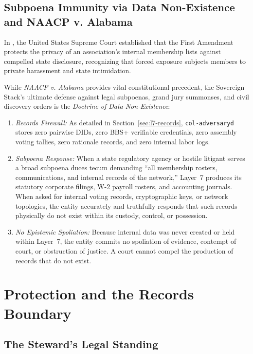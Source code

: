 \subsection{Subpoena Immunity via Data Non-Existence and NAACP v. Alabama}

In \textcite{naacp1958}, the United States Supreme Court established that the First Amendment protects the privacy of an association's internal membership lists against compelled state disclosure, recognizing that forced exposure subjects members to private harassment and state intimidation.

While \textit{NAACP v. Alabama} provides vital constitutional precedent, the Sovereign Stack's ultimate defense against legal subpoenas, grand jury summonses, and civil discovery orders is the \textit{Doctrine of Data Non-Existence}:
\begin{enumerate}
  \item \textit{Records Firewall:} As detailed in Section~\ref{sec:l7-records}, \texttt{col-adversaryd} stores zero pairwise DIDs, zero BBS+ verifiable credentials, zero assembly voting tallies, zero rationale records, and zero internal labor logs.
  \item \textit{Subpoena Response:} When a state regulatory agency or hostile litigant serves a broad subpoena duces tecum demanding ``all membership rosters, communications, and internal records of the network,'' Layer~7 produces its statutory corporate filings, W-2 payroll rosters, and accounting journals. When asked for internal voting records, cryptographic keys, or network topologies, the entity accurately and truthfully responds that such records physically do not exist within its custody, control, or possession.
  \item \textit{No Epistemic Spoliation:} Because internal data was never created or held within Layer~7, the entity commits no spoliation of evidence, contempt of court, or obstruction of justice. A court cannot compel the production of records that do not exist.
\end{enumerate}

\section{Protection and the Records Boundary}

\subsection{The Steward's Legal Standing}

